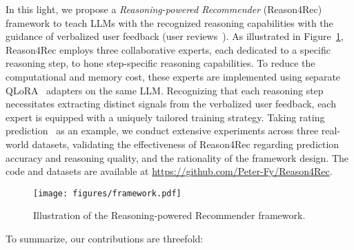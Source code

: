 In this light, we propose a \textit{Reasoning-powered Recommender} (Reason4Rec) framework to teach LLMs with the recognized reasoning capabilities with the guidance of verbalized user feedback (\eg user reviews~\cite{ReviewRecSurvey}). As illustrated in Figure~\ref{fig:framework}, Reason4Rec employs 
three collaborative experts, each dedicated to a specific reasoning step, to hone step-specific reasoning capabilities. 
To reduce the computational and memory cost, these experts are implemented using separate QLoRA~\cite{Qlora} adapters on the same LLM. 
Recognizing that each reasoning step necessitates extracting distinct signals from the verbalized user feedback, each expert is equipped with a uniquely tailored training strategy. Taking rating prediction~\cite{DAML} as an example, we conduct extensive experiments across three real-world datasets, validating the effectiveness of Reason4Rec regarding prediction accuracy and reasoning quality, and the rationality of the framework design. The code and datasets are available at \url{https://github.com/Peter-Fy/Reason4Rec}.


\begin{figure}[tbp]
\setlength{\abovecaptionskip}{0cm}
\setlength{\belowcaptionskip}{-0.3cm}
  \centering
  \texttt{[image: figures/framework.pdf]}
  \caption{Illustration of the Reasoning-powered Recommender framework.}
  \label{fig:framework}
\end{figure}

To summarize, our contributions are threefold:

